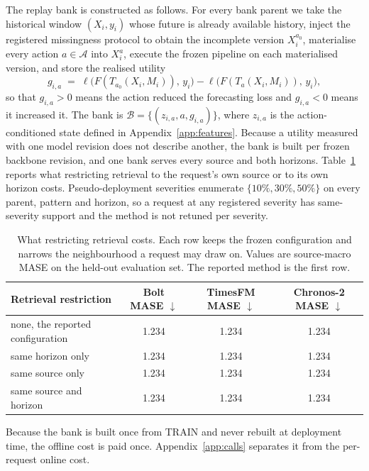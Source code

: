 \documentclass{article}
\newcommand{\calA}{\mathcal{A}}
\newcommand{\calB}{\mathcal{B}}
\newcommand{\loss}{\ell}
\begin{document}
The replay bank is constructed as follows. For every bank parent we take the historical
window $(X_i, y_i)$ whose future is already available history, inject the registered
missingness protocol to obtain the incomplete version $X_i^{a_0}$, materialise every action
$a \in \calA$ into $X_i^{a}$, execute the frozen pipeline on each materialised version, and
store the realised utility
\begin{equation}
  g_{i,a} \;=\; \loss\big(F(T_{a_0}(X_i, M_i)),\, y_i\big) - \loss\big(F(T_{a}(X_i, M_i)),\, y_i\big),
  \label{eq:app-gain}
\end{equation}
so that $g_{i,a} > 0$ means the action reduced the forecasting loss and $g_{i,a} < 0$ means it
increased it. The bank is
$\calB = \{(z_{i,a}, a, g_{i,a})\}$, where $z_{i,a}$ is the action-conditioned state defined
in Appendix~\ref{app:features}. Because a utility measured with one model revision does not describe another, the bank is
built per frozen backbone revision, and one bank serves every source and both horizons.
Table~\ref{tab:app-retrieval} reports what restricting retrieval to the request's own source
or to its own horizon costs. Pseudo-deployment severities enumerate
$\{10\%, 30\%, 50\%\}$ on every parent, pattern and horizon, so a request at any registered
severity has same-severity support and the method is not retuned per severity.

\begin{table}[h]
  \caption{What restricting retrieval costs. Each row keeps the frozen configuration and
  narrows the neighbourhood a request may draw on. Values are source-macro MASE on the
  held-out evaluation set. The reported method is the first row.}
  \label{tab:app-retrieval}
  \centering
  \small
  \setlength{\tabcolsep}{4pt}
\begin{tabular}{lccc}
    \toprule
    Retrieval restriction & Bolt MASE $\downarrow$ & TimesFM MASE $\downarrow$ & Chronos-2 MASE $\downarrow$ \\
    \midrule
    none, the reported configuration & 1.234 & 1.234 & 1.234 \\
    same horizon only                & 1.234   & 1.234   & 1.234 \\
    same source only                 & 1.234  & 1.234  & 1.234 \\
    same source and horizon          & 1.234 & 1.234 & 1.234 \\
    \bottomrule
  \end{tabular}
\end{table}
Because the bank is built once from TRAIN and never rebuilt at deployment time, the offline
cost is paid once. Appendix~\ref{app:calls} separates it from the per-request online cost.
\end{document}
